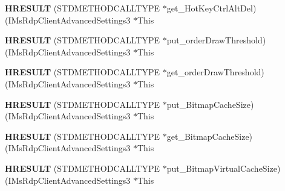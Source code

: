 \begin{DoxyCompactItemize}
\item 
\mbox{\label{struct_i_ms_rdp_client_advanced_settings3_vtbl_a2930b228cd5674189027e6e933d3494d}} 
{\bfseries H\+R\+E\+S\+U\+LT} (S\+T\+D\+M\+E\+T\+H\+O\+D\+C\+A\+L\+L\+T\+Y\+PE $\ast$get\+\_\+\+Hot\+Key\+Ctrl\+Alt\+Del)(I\+Ms\+Rdp\+Client\+Advanced\+Settings3 $\ast$This
\item 
\mbox{\label{struct_i_ms_rdp_client_advanced_settings3_vtbl_aec484a238278b3ce28c87f66b24cb347}} 
{\bfseries H\+R\+E\+S\+U\+LT} (S\+T\+D\+M\+E\+T\+H\+O\+D\+C\+A\+L\+L\+T\+Y\+PE $\ast$put\+\_\+order\+Draw\+Threshold)(I\+Ms\+Rdp\+Client\+Advanced\+Settings3 $\ast$This
\item 
\mbox{\label{struct_i_ms_rdp_client_advanced_settings3_vtbl_a2e48ffee89021b283c7320b77da132b9}} 
{\bfseries H\+R\+E\+S\+U\+LT} (S\+T\+D\+M\+E\+T\+H\+O\+D\+C\+A\+L\+L\+T\+Y\+PE $\ast$get\+\_\+order\+Draw\+Threshold)(I\+Ms\+Rdp\+Client\+Advanced\+Settings3 $\ast$This
\item 
\mbox{\label{struct_i_ms_rdp_client_advanced_settings3_vtbl_a604755e6ab1474d5dd4305b3d54adf46}} 
{\bfseries H\+R\+E\+S\+U\+LT} (S\+T\+D\+M\+E\+T\+H\+O\+D\+C\+A\+L\+L\+T\+Y\+PE $\ast$put\+\_\+\+Bitmap\+Cache\+Size)(I\+Ms\+Rdp\+Client\+Advanced\+Settings3 $\ast$This
\item 
\mbox{\label{struct_i_ms_rdp_client_advanced_settings3_vtbl_a48b5971f9cb8ebb39366e72e572743e6}} 
{\bfseries H\+R\+E\+S\+U\+LT} (S\+T\+D\+M\+E\+T\+H\+O\+D\+C\+A\+L\+L\+T\+Y\+PE $\ast$get\+\_\+\+Bitmap\+Cache\+Size)(I\+Ms\+Rdp\+Client\+Advanced\+Settings3 $\ast$This
\item 
\mbox{\label{struct_i_ms_rdp_client_advanced_settings3_vtbl_a7ba15eb9a95d8d96d5abe3e9f6d1c70b}} 
{\bfseries H\+R\+E\+S\+U\+LT} (S\+T\+D\+M\+E\+T\+H\+O\+D\+C\+A\+L\+L\+T\+Y\+PE $\ast$put\+\_\+\+Bitmap\+Virtual\+Cache\+Size)(I\+Ms\+Rdp\+Client\+Advanced\+Settings3 $\ast$This
\item 
\mbox{\label{struct_i_ms_rdp_client_advanced_settings3_vtbl_a47dc3fc21077eb0a0d23b28fa47d2a19}} 

\end{DoxyCompactItemize}
